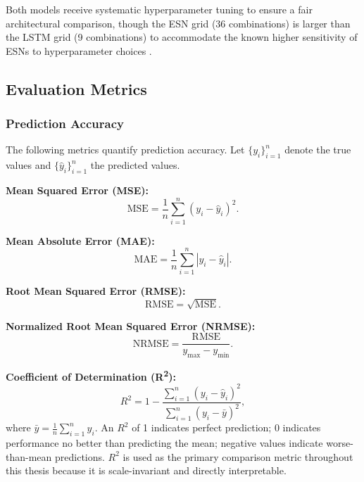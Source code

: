 Both models receive systematic hyperparameter tuning to ensure a fair architectural comparison, though the ESN grid (36 combinations) is larger than the LSTM grid (9 combinations) to accommodate the known higher sensitivity of ESNs to hyperparameter choices \cite{matzner2022hyperparameter}.

\subsection{Evaluation Metrics}
\label{sec:metrics}

\subsubsection{Prediction Accuracy}
\label{sec:accuracy_metrics}

The following metrics quantify prediction accuracy. Let $\{y_i\}_{i=1}^{n}$ denote the true values and $\{\hat{y}_i\}_{i=1}^{n}$ the predicted values.

\textbf{Mean Squared Error (MSE):}
\begin{equation}
    \text{MSE} = \frac{1}{n} \sum_{i=1}^{n} (y_i - \hat{y}_i)^2.
    \label{eq:mse}
\end{equation}

\textbf{Mean Absolute Error (MAE):}
\begin{equation}
    \text{MAE} = \frac{1}{n} \sum_{i=1}^{n} |y_i - \hat{y}_i|.
    \label{eq:mae}
\end{equation}

\textbf{Root Mean Squared Error (RMSE):}
\begin{equation}
    \text{RMSE} = \sqrt{\text{MSE}}.
    \label{eq:rmse}
\end{equation}

\textbf{Normalized Root Mean Squared Error (NRMSE):}
\begin{equation}
    \text{NRMSE} = \frac{\text{RMSE}}{y_{\max} - y_{\min}}.
    \label{eq:nrmse}
\end{equation}

\textbf{Coefficient of Determination (R\textsuperscript{2}):}
\begin{equation}
    R^2 = 1 - \frac{\sum_{i=1}^{n}(y_i - \hat{y}_i)^2}{\sum_{i=1}^{n}(y_i - \bar{y})^2},
    \label{eq:r2}
\end{equation}
where $\bar{y} = \frac{1}{n}\sum_{i=1}^{n} y_i$. An $R^2$ of 1 indicates perfect prediction; 0 indicates performance no better than predicting the mean; negative values indicate worse-than-mean predictions. $R^2$ is used as the primary comparison metric throughout this thesis because it is scale-invariant and directly interpretable.

